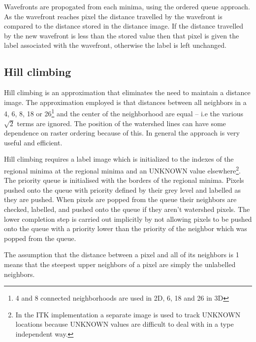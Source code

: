 \documentclass{InsightArticle}
\begin{document}
Wavefronts are propogated from each minima, using the ordered queue
approach. As the wavefront reaches pixel the distance travelled by the
wavefront is compared to the distance stored in the distance image. If
the distance travelled by the new wavefront is less than the stored
value then that pixel is given the label associated with the
wavefront, otherwise the label is left unchanged.

\subsection{Hill climbing}
Hill climbing is an approximation that eliminates the need to maintain
a distance image. The approximation employed is that distances between
all neighbors in a 4, 6, 8, 18 or 26\footnote{4 and 8 connected
neighborhoods are used in 2D, 6, 18 and 26 in 3D} and the center of
the neighborhood are equal -- i.e the various $\sqrt{2}$ terms are
ignored. The position of the watershed lines can have some dependence
on raster ordering because of this. In general the approach is very useful and efficient.

Hill climbing requires a label image which is initialized to the
indexes of the regional minima at the regional minima and an UNKNOWN
value elsewhere\footnote{In the ITK implementation a separate image is
used to track UNKNOWN locations because UNKNOWN values are difficult
to deal with in a type independent way.}. The priority queue is
initialised with the borders of the regional minima. Pixels pushed
onto the queue with priority defined by their grey level and labelled
as they are pushed. When pixels are popped from the queue their
neighbors are checked, labelled, and pushed onto the queue if they
aren't watershed pixels. The lower completion step is carried out
implicitly by not allowing pixels to be pushed onto the queue with a
priority lower than the priority of the neighbor which was popped from
the queue.

The assumption that the distance between a pixel and all of its
neighbors is 1 means that the steepest upper neighbors of a pixel are
simply the unlabelled neighbors. 
\end{document}
